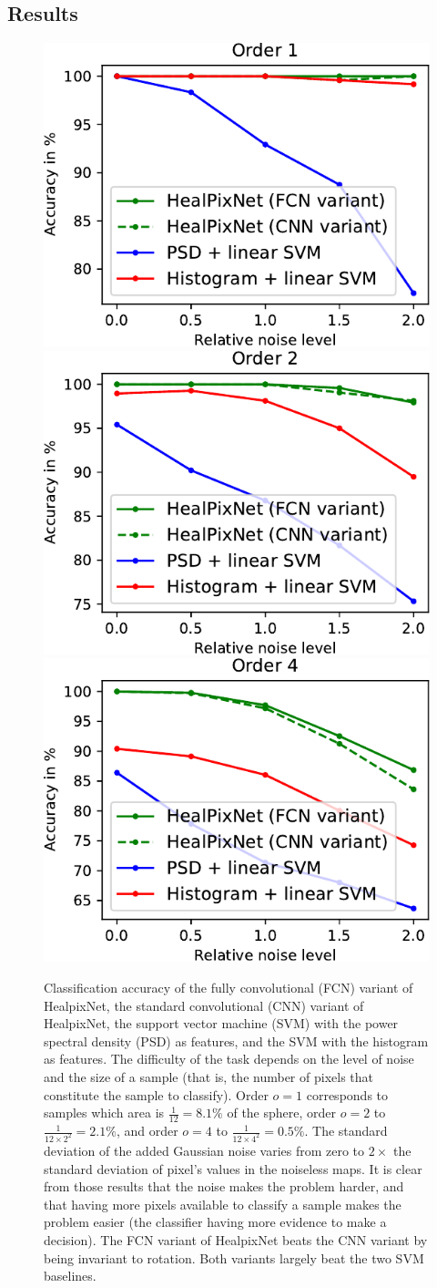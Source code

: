\documentclass[final,twocolumn,3p,times,sort&compress]{elsarticle}
\newcommand{\1}{\b{1}}              %
\newcommand{\0}{\b{0}}              %
\begin{document}
\subsection{Results}

\begin{figure}
	\centering
	\includegraphics[width=0.32\linewidth]{result_order1}
	\hfill
	\includegraphics[width=0.32\linewidth]{result_order2}
	\hfill
	\includegraphics[width=0.32\linewidth]{result_order4}
	\caption{
		Classification accuracy of the fully convolutional (FCN) variant of HealpixNet, the standard convolutional (CNN) variant of HealpixNet, the support vector machine (SVM) with the power spectral density (PSD) as features, and the SVM with the histogram as features.
		The difficulty of the task depends on the level of noise and the size of a sample (that is, the number of pixels that constitute the sample to classify). Order $o=1$ corresponds to samples which area is $\frac{1}{12}=8.1\%$ of the sphere, order $o=2$ to $\frac{1}{12 \times 2^2} = 2.1\%$, and order $o=4$ to $\frac{1}{12 \times 4^2} = 0.5\%$. The standard deviation of the added Gaussian noise varies from zero to $2\times$ the standard deviation of pixel's values in the noiseless maps.
		It is clear from those results that the noise makes the problem harder, and that having more pixels available to classify a sample makes the problem easier (the classifier having more evidence to make a decision). The FCN variant of HealpixNet beats the CNN variant by being invariant to rotation. Both variants largely beat the two SVM baselines.
	}
	\label{fig:results}
\end{figure}
\end{document}

